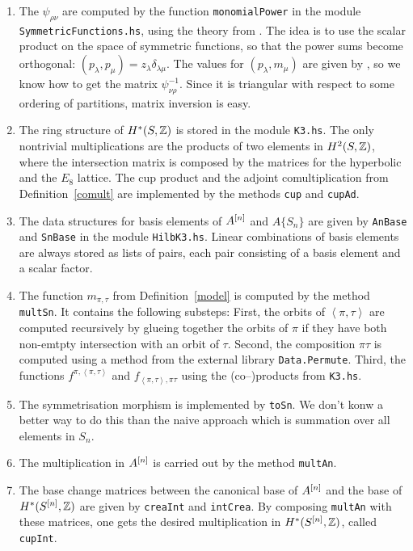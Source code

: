 \begin{enumerate}
 \item The $\psi_{\rho\nu}$ are computed by the function \verb|monomialPower| in the module \verb|SymmetricFunctions.hs|, using the theory from \cite[Sect.~3.7]{Lascoux}. The idea is to use the scalar product on the space of symmetric functions, so that the power sums become orthogonal: $(p_\lambda,p_\mu) = z_\lambda \delta_{\lambda\mu}$. The values for $(p_\lambda,m_\mu)$ are given by \cite[Lemma~3.7.1]{Lascoux}, so we know how to get the matrix $\psi_{\nu\rho}^{-1}$. Since it is triangular with respect to some ordering of partitions, matrix inversion is easy.
 \item The ring structure of $H^*(S,\mathbb{Z})$ is stored in the module \verb|K3.hs|. The only nontrivial multiplications are the products of two elements in $H^2(S,\mathbb{Z})$, where the intersection matrix is composed by the matrices for the hyperbolic and the $E_8$ lattice. The cup product and the adjoint comultiplication from Definition~\ref{comult} are implemented by the methods \verb|cup| and \verb|cupAd|.
 \item The data structures for basis elements of $A^{[n]}$ and $A\{S_n\}$ are given by \verb|AnBase| and \verb|SnBase| in the module \verb|HilbK3.hs|. Linear combinations of basis elements are always stored as lists of pairs, each pair consisting of a basis element and a scalar factor.
 \item The function $m_{\pi,\tau}$ from Definition~\ref{model} is computed by the method \verb|multSn|. It contains the following substeps: First, the orbits of $\left<\pi,\tau\right>$ are computed recursively by glueing together the orbits of $\pi$ if they have both non-emtpty intersection with an orbit of $\tau$. Second, the composition $\pi\tau$ is computed using a method from the external library \verb|Data.Permute|. Third, the functions $f^{\pi,\left<\pi,\tau\right>}$ and $f_{\left<\pi,\tau\right>,\pi\tau}$ using the (co--)products from \verb|K3.hs|.
 \item The symmetrisation morphism is implemented by \verb|toSn|. We don't konw a better way to do this than the naive approach which is summation over all elements in $S_n$.
 \item The multiplication in $A^{[n]}$ is carried out by the method \verb|multAn|.
 \item The base change matrices between the canonical base of $A^{[n]}$ and the base of $H^*(S^{[n]},\mathbb{Z})$ are given by \verb|creaInt| and \verb|intCrea|. By composing \verb|multAn| with these matrices, one gets the desired multiplication in $H^*(S^{[n]},\mathbb{Z})$, called \verb|cupInt|.
\end{enumerate}

